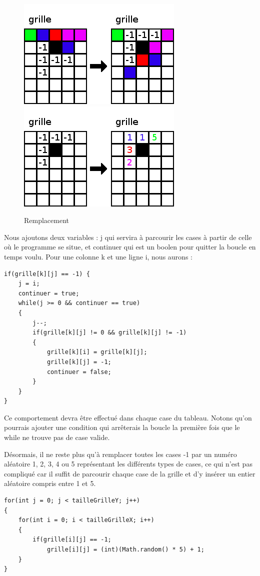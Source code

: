 \begin{figure}[ht]
	\center
	\caption{\label{Remplacement} Remplacement}
	\includegraphics{imgs/Remplacement1}
	\includegraphics{imgs/Remplacement2}
\end{figure}
	
	Nous ajoutons deux variables : j qui servira à parcourir les cases à partir de celle où le programme se situe, et continuer qui est un boolen pour quitter la boucle en temps voulu.
	Pour une colonne k et une ligne i, nous aurons :
\begin{lstlisting}
if(grille[k][j] == -1) {
	j = i;
	continuer = true;
	while(j >= 0 && continuer == true)
	{
		j--;
		if(grille[k][j] != 0 && grille[k][j] != -1)
		{
			grille[k][i] = grille[k][j];
			grille[k][j] = -1;
			continuer = false;
		}
	}
}
\end{lstlisting}

	Ce comportement devra être effectué dans chaque case du tableau. Notons qu'on pourrais ajouter une condition qui arrêterais la boucle la première fois que le while ne trouve pas de case valide.
	
	Désormais, il ne reste plus qu'à remplacer toutes les cases -1 par un numéro aléatoire 1, 2, 3, 4 ou 5 représentant les différents types de cases, ce qui n'est pas compliqué car 
il suffit de parcourir chaque case de la grille et d'y insérer un entier aléatoire compris entre 1 et 5.

\begin{lstlisting}
for(int j = 0; j < tailleGrilleY; j++)
{
	for(int i = 0; i < tailleGrilleX; i++)
	{
		if(grille[i][j] == -1;
			grille[i][j] = (int)(Math.random() * 5) + 1;
	}
}
\end{lstlisting}

